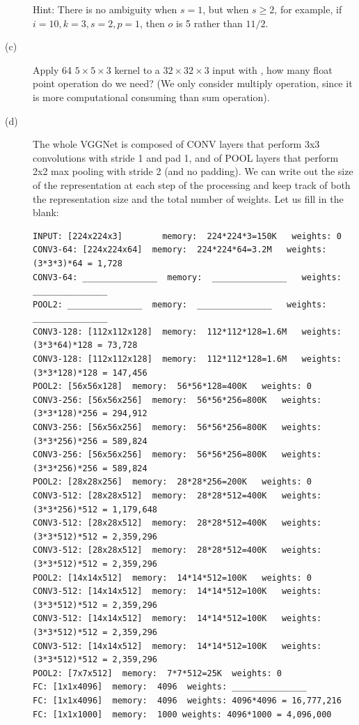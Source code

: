 \documentclass[12pt]{article}
\newcommand{\red}[1]{{\color{red}{#1}}}
\begin{document}
\begin{description}
	      Hint: There is no ambiguity when $s=1$, but when $s\ge 2$, for example, if $i=10,k=3,s=2,p=1$, then $o$ is 5 rather than $11/2$. 
	\item[(c)] Apply 64 $5\times 5\times 3$ kernel to a $32 \times 32 \times3$ input with \red{unit stride and no padding, \ie using $1  \times 1$ strides and padding with a $0\times 0$ border of zeros}, how many float point operation do we need? (We only consider multiply operation, since it is more computational consuming than sum operation). \red{What about unit stride and same padding? \ie Using $1 \times 1$ strides and  padding with a $2 \times 2$ border of zeros?} 
	\item[(d)] The whole VGGNet is composed of CONV layers that perform 3x3 convolutions with stride 1 and pad 1, and of POOL layers that perform 2x2 max pooling with stride 2 (and no padding). We can write out the size of the representation at each step of the processing and keep track of both the representation size and the total number of weights. Let us fill in the blank:
	\begin{verbatim}
INPUT: [224x224x3]        memory:  224*224*3=150K   weights: 0
CONV3-64: [224x224x64]  memory:  224*224*64=3.2M   weights: (3*3*3)*64 = 1,728
CONV3-64: _______________  memory:  _______________   weights: _______________
POOL2: _______________  memory:  _______________   weights: _______________
CONV3-128: [112x112x128]  memory:  112*112*128=1.6M   weights: (3*3*64)*128 = 73,728
CONV3-128: [112x112x128]  memory:  112*112*128=1.6M   weights: (3*3*128)*128 = 147,456
POOL2: [56x56x128]  memory:  56*56*128=400K   weights: 0
CONV3-256: [56x56x256]  memory:  56*56*256=800K   weights: (3*3*128)*256 = 294,912
CONV3-256: [56x56x256]  memory:  56*56*256=800K   weights: (3*3*256)*256 = 589,824
CONV3-256: [56x56x256]  memory:  56*56*256=800K   weights: (3*3*256)*256 = 589,824
POOL2: [28x28x256]  memory:  28*28*256=200K   weights: 0
CONV3-512: [28x28x512]  memory:  28*28*512=400K   weights: (3*3*256)*512 = 1,179,648
CONV3-512: [28x28x512]  memory:  28*28*512=400K   weights: (3*3*512)*512 = 2,359,296
CONV3-512: [28x28x512]  memory:  28*28*512=400K   weights: (3*3*512)*512 = 2,359,296
POOL2: [14x14x512]  memory:  14*14*512=100K   weights: 0
CONV3-512: [14x14x512]  memory:  14*14*512=100K   weights: (3*3*512)*512 = 2,359,296
CONV3-512: [14x14x512]  memory:  14*14*512=100K   weights: (3*3*512)*512 = 2,359,296
CONV3-512: [14x14x512]  memory:  14*14*512=100K   weights: (3*3*512)*512 = 2,359,296
POOL2: [7x7x512]  memory:  7*7*512=25K  weights: 0
FC: [1x1x4096]  memory:  4096  weights: _______________
FC: [1x1x4096]  memory:  4096  weights: 4096*4096 = 16,777,216
FC: [1x1x1000]  memory:  1000 weights: 4096*1000 = 4,096,000
	\end{verbatim}

\end{description}
\end{document}

